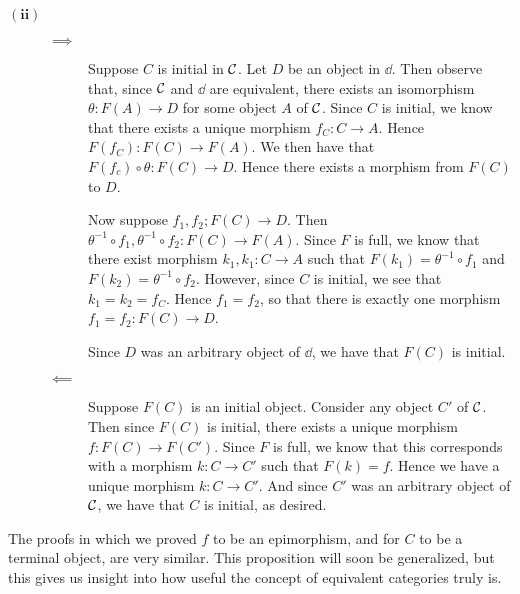 \begin{prf}
\begin{description}
            \item[$\bm{(ii)}$] 
            \begin{description}
                \item[$\bm{\implies}$] Suppose $C$ is initial in
                $\mathcal{C}$. Let $D$ be an object in $\dd$. Then observe
                that, since $\mathcal{C}$ and $\dd$ are equivalent, there
                exists an isomorphism $\theta: F(A) \to D$ for some
                object $A$ of $\mathcal{C}$. Since $C$ is initial, we know
                that there exists a unique morphism $f_C: C \to A$.
                Hence $F(f_C): F(C)\to F(A)$. We then have that $F(f_c)
                \circ \theta : F(C) \to D$. Hence there exists a
                morphism from $F(C)$ to $D$. 

                Now suppose $f_1, f_2; F(C) \to D$. Then $\theta^{-1}
                \circ f_1, \theta^{-1}\circ f_2: F(C) \to F(A)$. Since
                $F$ is full, we know that there exist morphism $k_1,
                k_1: C \to A$ such that $F(k_1) = \theta^{-1}\circ
                f_1$ and $F(k_2) = \theta^{-1}\circ f_2$. However,
                since $C$ is initial, we see that $k_1 = k_2 = f_C$.
                Hence $f_1 = f_2$, so that there is exactly one
                morphism $f_1=f_2:F(C) \to D$. 

                Since $D$ was an arbitrary object of $\dd$, we have
                that $F(C)$ is initial. 
                
                \item[$\bm{\impliedby}$] 
                Suppose $F(C)$ is an initial object. Consider any
                object $C'$ of $\mathcal{C}$. Then since $F(C)$ is initial, there exists a unique
                morphism $f: F(C) \to F(C')$. Since $F$ is full, we
                know that this corresponds with a morphism $k: C \to
                C'$ such that $F(k) = f$. Hence we have a unique
                morphism $k: C \to C'$. And since $C'$ was an 
                arbitrary object of $\mathcal{C}$, we have that $C$ is
                initial, as desired. 
            \end{description}  
        \end{description}
    \end{prf}
    The proofs in which we proved $f$ to be an epimorphism, and for $C$ 
    to be a terminal object, are very similar. This proposition will soon be
    generalized, but this gives us insight into how useful the concept
    of equivalent categories truly is. 

